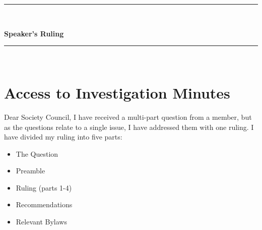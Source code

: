 \begin{center}
\rule{\textwidth}{3.6pt}\\[\baselineskip] %
\begin{Huge}
\textbf{Speaker's Ruling}
\end{Huge}

\rule{\textwidth}{3.6pt}\\[\baselineskip] %



\vspace*{2\baselineskip} %
\end{center}
\section*{Access to Investigation Minutes}




Dear Society Council,
I have received a multi-part question from a member, but as the questions relate to a single issue, I have addressed them with one ruling. I have divided my ruling into five parts:
\begin{itemize}
\item The Question
\item Preamble
\item Ruling (parts 1-4)
\item Recommendations
\item Relevant Bylaws
\end{itemize}



